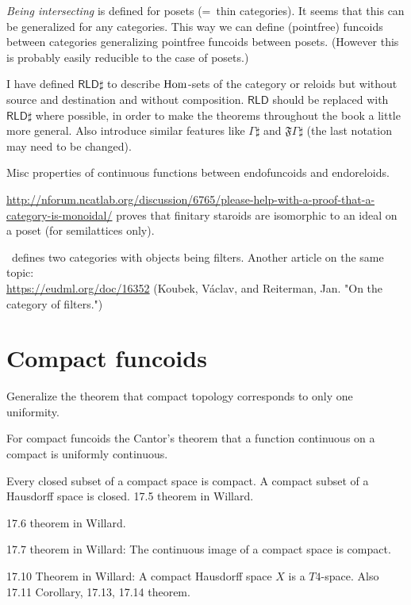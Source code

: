 \documentclass{amsart}
\begin{document}
\emph{Being intersecting} is defined for posets (=~thin categories). It seems that this can be generalized for any categories.
This way we can define (pointfree) funcoids between categories generalizing pointfree funcoids between posets.
(However this is probably easily reducible to the case of posets.)

I have defined $\mathsf{RLD}\sharp$ to describe $\operatorname{Hom}$-sets of the category or reloids but without source and destination and without composition.
$\mathsf{RLD}$ should be replaced with $\mathsf{RLD}\sharp$ where possible, in order to make the theorems throughout the book a little more general.
Also introduce similar features like $\Gamma\sharp$ and $\mathfrak{F}\Gamma\sharp$ (the last notation may need to be changed).

Misc properties of continuous functions between endofuncoids and endoreloids.

\url{http://nforum.ncatlab.org/discussion/6765/please-help-with-a-proof-that-a-category-is-monoidal/} proves that
finitary staroids are isomorphic to an ideal on a poset (for semilattices only).

\cite{filt-cat}~defines two categories with objects being filters. Another article on the same topic:\\
\url{https://eudml.org/doc/16352} (Koubek, V\'aclav, and Reiterman, Jan. "On the category of filters.")


\section{Compact funcoids}

Generalize the theorem that compact topology corresponds to only one uniformity.

For compact funcoids the Cantor's theorem that a function continuous on a compact is uniformly continuous.

Every closed subset of a compact space is compact. A compact subset of a Hausdorff space is closed. 17.5 theorem in Willard.

17.6 theorem in Willard.

17.7 theorem in Willard: The continuous image of a compact space is compact.

17.10 Theorem in Willard: A compact Hausdorff space $X$ is a $T 4$-space. Also 17.11 Corollary, 17.13, 17.14 theorem.
\end{document}
